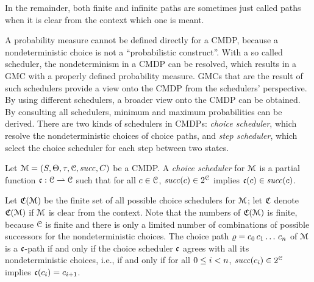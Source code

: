 In the remainder, both finite and infinite paths are sometimes just called paths when it is clear from the context which one is meant.


A probability measure cannot be defined directly for a CMDP, because a nondeterministic choice is not a ``probabilistic construct''.
With a so called scheduler, the nondeterminism in a CMDP can be resolved, which results in a GMC with a properly defined probability measure.
GMCs that are the result of such schedulers provide a view onto the CMDP from the schedulers' perspective.
By using different schedulers, a broader view onto the CMDP can be obtained.
By consulting all schedulers, minimum and maximum probabilities can be derived.
There are two kinds of schedulers in CMDPs: \emph{choice scheduler}, which resolve the nondeterministic choices of choice paths, and \emph{step scheduler}, which select the choice scheduler for each step between two states.


\begin{definition}
\label{def:CMDP_choicescheduler}
Let $\Cmdp=(\States, \Targets, \targetstate, \Choices, \choiceTrans, \StateRootChoice)$ be a CMDP. A \emph{choice scheduler} for $\Cmdp$ is a partial function $\ChoiceScheduler : \Choices \rightharpoonup \Choices$ such that for all $\cmdpChoice \in \Choices$, $\choiceTrans(\cmdpChoice)\in 2^{\Choices}$ implies $\ChoiceScheduler(\cmdpChoice) \in \choiceTrans(\cmdpChoice)$.
\end{definition}
%
Let $\ChoiceSchedulers(\Cmdp)$ be the finite set of all possible choice schedulers for $\Cmdp$;
let $\ChoiceSchedulers$ denote $\ChoiceSchedulers(\Cmdp)$ if $\Cmdp$ is clear from the context.
Note that the numbers of $\ChoiceSchedulers(\Cmdp)$ is finite, because $\Choices$ is finite and there is only a limited number of combinations of possible successors for the nondeterministic choices.
%
%
The choice path $\cpath = \cmdpChoice_0\,\cmdpChoice_1\dotspath\,\cmdpChoice_n$ of $\Cmdp$ is a $\ChoiceScheduler$-path if and only if the choice scheduler $\ChoiceScheduler$ agrees with all its nondeterministic choices, i.e., if and only if for all $\natrangeex{i}{0}{n}$, $\choiceTrans(\cmdpChoice_i)\in 2^{\Choices}$ implies $\ChoiceScheduler(\cmdpChoice_i)=\cmdpChoice_{i+1}$.

